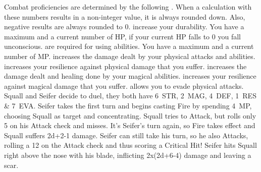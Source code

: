 %
\clearpage
%
{Combat proficiencies are determined by the following .
When a calculation with these numbers results in a non-integer value, it is always rounded down.
Also, negative results are always rounded to 0.\ofrow
{} increase your durability. You have a maximum and a current number of HP, if your current HP falls to 0 you fall unconscious. \ofrow
{} are required for using abilities. You have a maximum and a current number of MP. \ofrow
{} increases the damage dealt by your physical attacks and abilities. \ofrow
{} increases your resilience against physical damage that you suffer. \ofrow
{} increases the damage dealt and healing done by your magical abilities. \ofrow
{} increases your resilience against magical damage that you suffer. \ofrow
{} allows you to evade physical attacks.}
%
\vfill
%
%
%
\vfill
%
{
	Squall and Seifer decide to duel, they both have 6~STR, 2~MAG, 4~DEF, 1~RES \& 7~EVA.
	Seifer takes the first turn and begins casting Fire by spending 4~MP, choosing Squall as target and concentrating.
	Squall tries to Attack, but rolls only 5 on his Attack check and misses.
	It's Seifer's turn again, so Fire takes effect and Squall suffers \mbox{2d+2-1} damage. 
	Seifer can still take his turn, so he also Attacks, rolling a 12 on the Attack check and thus scoring a Critical Hit!
	Seifer hits Squall right above the nose with his blade, inflicting \mbox{2x(2d+6-4)} damage and leaving a scar.
}
